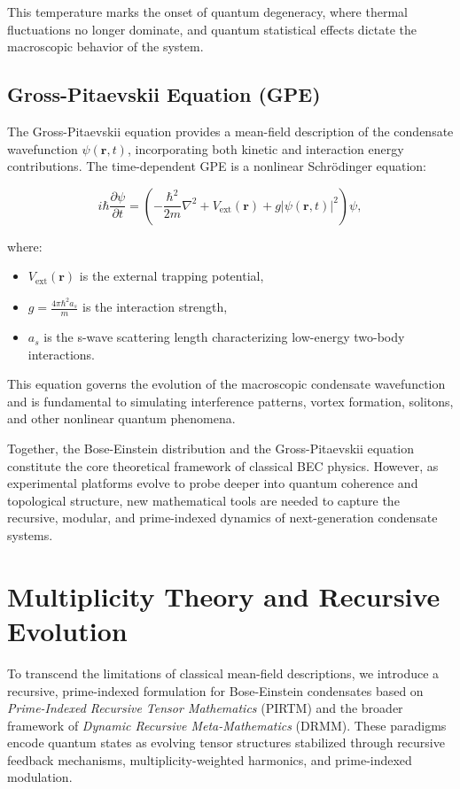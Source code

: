 \documentclass{article}
\theoremstyle{plain}
\begin{document}
This temperature marks the onset of quantum degeneracy, where thermal fluctuations no longer dominate, and quantum statistical effects dictate the macroscopic behavior of the system.

\subsection{Gross-Pitaevskii Equation (GPE)}

The Gross-Pitaevskii equation provides a mean-field description of the condensate wavefunction \( \psi(\mathbf{r}, t) \), incorporating both kinetic and interaction energy contributions. The time-dependent GPE is a nonlinear Schrödinger equation:

\begin{equation}
i \hbar \frac{\partial \psi}{\partial t} = \left( -\frac{\hbar^2}{2m} \nabla^2 + V_{\text{ext}}(\mathbf{r}) + g |\psi(\mathbf{r}, t)|^2 \right) \psi,
\end{equation}

where:
\begin{itemize}
  \item \( V_{\text{ext}}(\mathbf{r}) \) is the external trapping potential,
  \item \( g = \frac{4\pi \hbar^2 a_s}{m} \) is the interaction strength,
  \item \( a_s \) is the s-wave scattering length characterizing low-energy two-body interactions.
\end{itemize}

This equation governs the evolution of the macroscopic condensate wavefunction and is fundamental to simulating interference patterns, vortex formation, solitons, and other nonlinear quantum phenomena.

\vspace{0.5em}
Together, the Bose-Einstein distribution and the Gross-Pitaevskii equation constitute the core theoretical framework of classical BEC physics. However, as experimental platforms evolve to probe deeper into quantum coherence and topological structure, new mathematical tools are needed to capture the recursive, modular, and prime-indexed dynamics of next-generation condensate systems.
\section{Multiplicity Theory and Recursive Evolution}

To transcend the limitations of classical mean-field descriptions, we introduce a recursive, prime-indexed formulation for Bose-Einstein condensates based on \textit{Prime-Indexed Recursive Tensor Mathematics} (PIRTM) and the broader framework of \textit{Dynamic Recursive Meta-Mathematics} (DRMM). These paradigms encode quantum states as evolving tensor structures stabilized through recursive feedback mechanisms, multiplicity-weighted harmonics, and prime-indexed modulation.
\end{document}
